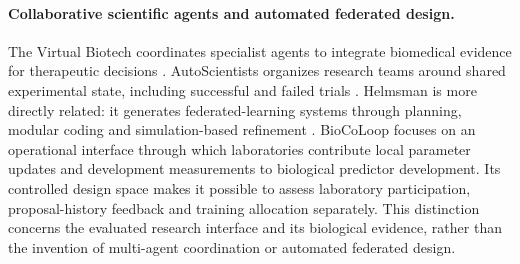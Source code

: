 \paragraph{Collaborative scientific agents and automated federated design.}
The Virtual Biotech coordinates specialist agents to integrate biomedical evidence for therapeutic decisions \citep{Zhang2026VirtualBiotech}. AutoScientists organizes research teams around shared experimental state, including successful and failed trials \citep{Gao2026AutoScientists}. Helmsman is more directly related: it generates federated-learning systems through planning, modular coding and simulation-based refinement \citep{Li2025Helmsman}. BioCoLoop focuses on an operational interface through which laboratories contribute local parameter updates and development measurements to biological predictor development. Its controlled design space makes it possible to assess laboratory participation, proposal-history feedback and training allocation separately. This distinction concerns the evaluated research interface and its biological evidence, rather than the invention of multi-agent coordination or automated federated design.
